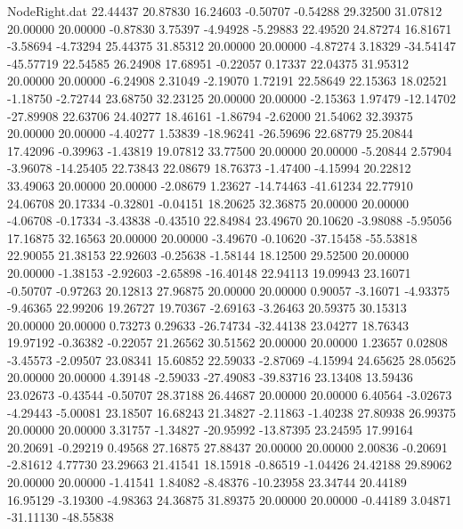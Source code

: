 \begin{filecontents}{NodeRight.dat}
  22.44437   20.87830   16.24603    -0.50707   -0.54288   29.32500   31.07812   20.00000   20.00000   -0.87830    3.75397   -4.94928   -5.29883
  22.49520   24.87274   16.81671    -3.58694   -4.73294   25.44375   31.85312   20.00000   20.00000   -4.87274    3.18329  -34.54147  -45.57719
  22.54585   26.24908   17.68951    -0.22057    0.17337   22.04375   31.95312   20.00000   20.00000   -6.24908    2.31049   -2.19070    1.72191
  22.58649   22.15363   18.02521    -1.18750   -2.72744   23.68750   32.23125   20.00000   20.00000   -2.15363    1.97479  -12.14702  -27.89908
  22.63706   24.40277   18.46161    -1.86794   -2.62000   21.54062   32.39375   20.00000   20.00000   -4.40277    1.53839  -18.96241  -26.59696
  22.68779   25.20844   17.42096    -0.39963   -1.43819   19.07812   33.77500   20.00000   20.00000   -5.20844    2.57904   -3.96078  -14.25405
  22.73843   22.08679   18.76373    -1.47400   -4.15994   20.22812   33.49063   20.00000   20.00000   -2.08679    1.23627  -14.74463  -41.61234
  22.77910   24.06708   20.17334    -0.32801   -0.04151   18.20625   32.36875   20.00000   20.00000   -4.06708   -0.17334   -3.43838   -0.43510
  22.84984   23.49670   20.10620    -3.98088   -5.95056   17.16875   32.16563   20.00000   20.00000   -3.49670   -0.10620  -37.15458  -55.53818
  22.90055   21.38153   22.92603    -0.25638   -1.58144   18.12500   29.52500   20.00000   20.00000   -1.38153   -2.92603   -2.65898  -16.40148
  22.94113   19.09943   23.16071    -0.50707   -0.97263   20.12813   27.96875   20.00000   20.00000    0.90057   -3.16071   -4.93375   -9.46365
  22.99206   19.26727   19.70367    -2.69163   -3.26463   20.59375   30.15313   20.00000   20.00000    0.73273    0.29633  -26.74734  -32.44138
  23.04277   18.76343   19.97192    -0.36382   -0.22057   21.26562   30.51562   20.00000   20.00000    1.23657    0.02808   -3.45573   -2.09507
  23.08341   15.60852   22.59033    -2.87069   -4.15994   24.65625   28.05625   20.00000   20.00000    4.39148   -2.59033  -27.49083  -39.83716
  23.13408   13.59436   23.02673    -0.43544   -0.50707   28.37188   26.44687   20.00000   20.00000    6.40564   -3.02673   -4.29443   -5.00081
  23.18507   16.68243   21.34827    -2.11863   -1.40238   27.80938   26.99375   20.00000   20.00000    3.31757   -1.34827  -20.95992  -13.87395
  23.24595   17.99164   20.20691    -0.29219    0.49568   27.16875   27.88437   20.00000   20.00000    2.00836   -0.20691   -2.81612    4.77730
  23.29663   21.41541   18.15918    -0.86519   -1.04426   24.42188   29.89062   20.00000   20.00000   -1.41541    1.84082   -8.48376  -10.23958
  23.34744   20.44189   16.95129    -3.19300   -4.98363   24.36875   31.89375   20.00000   20.00000   -0.44189    3.04871  -31.11130  -48.55838

\end{filecontents}
